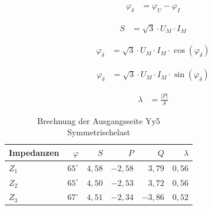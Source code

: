 \begin{enumerate}[label=\alph*)]
	      \begin{minipage}{0.5\textwidth}
		      \begin{center}
			      \begin{align*}
				      \varphi_{\delta} & = \varphi_{U} - \varphi_{I}
			      \end{align*}
		      \end{center}
	      \end{minipage}
	      \begin{minipage}{0.5\textwidth}
		      \begin{center}
			      \begin{align*}
				      S & = \sqrt{3}\cdot U_M\cdot I_M
			      \end{align*}
		      \end{center}
	      \end{minipage}
	      \begin{minipage}{0.5\textwidth}
		      \begin{center}
			      \begin{align*}
				      \varphi_{\delta} & = \sqrt{3}\cdot U_M\cdot I_M\cdot\cos(\varphi_{\delta})
			      \end{align*}
		      \end{center}
	      \end{minipage}
	      \begin{minipage}{0.5\textwidth}
		      \begin{center}
			      \begin{align*}
				      \varphi_{\delta} & = \sqrt{3}\cdot U_M\cdot I_M\cdot\sin(\varphi_{\delta})
			      \end{align*}
		      \end{center}
	      \end{minipage}
	      \begin{center}
		      \begin{minipage}{0.5\textwidth}
			      \begin{center}
				      \begin{align*}
					      \lambda & = \frac{|P|}{S}
				      \end{align*}
			      \end{center}
		      \end{minipage}
	      \end{center}

	      \begin{table}[h!]
		      \caption{Brechnung der Ausgangsseite Yy5 Symmetrischelast}
		      \centering
		      \begin{tabular}{lrrrrr}
			      \hline
			      Impedanzen & $\varphi$    & $S$    & $P$      & $Q$      & $\lambda$ \\ \hline
			      $Z_1$      & $65  ^\circ$ & $4,58$ & $-2,58$  & $ 3,79 $ & $0,56$    \\
			      $Z_2$      & $65^\circ$   & $4,50$ & $-2,53 $ & $ 3,72$  & $0,56$    \\
			      $Z_3$      & $67^\circ  $ & $4,51$ & $-2,34$  & $ -3,86$ & $0,52$    \\ \hline
		      \end{tabular}
	      \end{table}


\end{enumerate}
